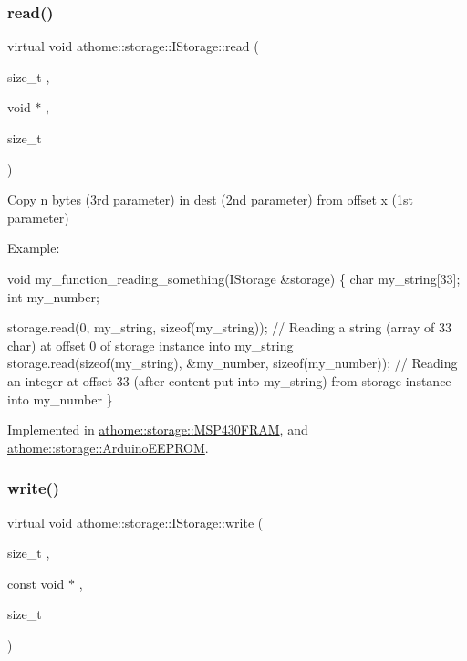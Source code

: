 \subsubsection{\texorpdfstring{read()}{read()}}
{\footnotesize\ttfamily virtual void athome\+::storage\+::\+I\+Storage\+::read (\begin{DoxyParamCaption}\item[{size\+\_\+t}]{,  }\item[{void $\ast$}]{,  }\item[{size\+\_\+t}]{ }\end{DoxyParamCaption})\hspace{0.3cm}{\ttfamily [pure virtual]}}

Copy n bytes (3rd parameter) in dest (2nd parameter) from offset x (1st parameter)

Example\+:


\begin{DoxyCode}
\textcolor{keywordtype}{void} my\_function\_reading\_something(IStorage &storage) \{
  \textcolor{keywordtype}{char} my\_string[33];
  \textcolor{keywordtype}{int} my\_number;

  storage.read(0, my\_string, \textcolor{keyword}{sizeof}(my\_string)); \textcolor{comment}{// Reading a string (array of 33 char) at offset 0 of
       storage instance into my\_string}
  storage.read(\textcolor{keyword}{sizeof}(my\_string), &my\_number, \textcolor{keyword}{sizeof}(my\_number)); \textcolor{comment}{// Reading an integer at offset 33 (after
       content put into my\_string) from storage instance into my\_number}
\}
\end{DoxyCode}
 

Implemented in \mbox{\hyperlink{classathome_1_1storage_1_1_m_s_p430_f_r_a_m_a3a00a26565491d08d26f505930453fb7}{athome\+::storage\+::\+M\+S\+P430\+F\+R\+AM}}, and \mbox{\hyperlink{classathome_1_1storage_1_1_arduino_e_e_p_r_o_m_a853674189981dd3395ea76911d2eb1a0}{athome\+::storage\+::\+Arduino\+E\+E\+P\+R\+OM}}.

\mbox{\label{classathome_1_1storage_1_1_i_storage_a1017bb6ad438313b98197893954e52f1}} 
\subsubsection{\texorpdfstring{write()}{write()}}
{\footnotesize\ttfamily virtual void athome\+::storage\+::\+I\+Storage\+::write (\begin{DoxyParamCaption}\item[{size\+\_\+t}]{,  }\item[{const void $\ast$}]{,  }\item[{size\+\_\+t}]{ }\end{DoxyParamCaption})\hspace{0.3cm}{\ttfamily [pure virtual]}}

